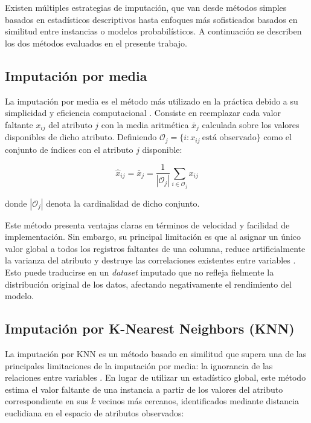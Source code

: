 Existen múltiples estrategias de imputación, que van desde métodos simples
basados en estadísticos descriptivos hasta enfoques más sofisticados basados
en similitud entre instancias o modelos probabilísticos. A continuación se
describen los dos métodos evaluados en el presente trabajo.

\subsection{Imputación por media}

La imputación por media es el método más utilizado en la práctica debido
a su simplicidad y eficiencia computacional \parencite{garcia2017}. Consiste
en reemplazar cada valor faltante $x_{ij}$ del atributo $j$ con la media
aritmética $\bar{x}_j$ calculada sobre los valores disponibles de dicho
atributo. Definiendo $\mathcal{O}_j = \{i : x_{ij}\ \text{está observado}\}$
como el conjunto de índices con el atributo $j$ disponible:

\begin{equation}
    \hat{x}_{ij} = \bar{x}_j = \frac{1}{|\mathcal{O}_j|}
    \sum_{i \in \mathcal{O}_j} x_{ij}
\end{equation}

donde $|\mathcal{O}_j|$ denota la cardinalidad de dicho conjunto.

Este método presenta ventajas claras en términos de velocidad y facilidad
de implementación. Sin embargo, su principal limitación es que al asignar
un único valor global a todos los registros faltantes de una columna, reduce
artificialmente la varianza del atributo y destruye las correlaciones
existentes entre variables \parencite{little2019}. Esto puede traducirse en
un \textit{dataset} imputado que no refleja fielmente la distribución original de los
datos, afectando negativamente el rendimiento del modelo.

\subsection{Imputación por K-Nearest Neighbors (KNN)}

La imputación por KNN es un método basado en similitud que supera una de
las principales limitaciones de la imputación por media: la ignorancia de
las relaciones entre variables \parencite{troyanskaya2001}. En lugar de
utilizar un estadístico global, este método estima el valor faltante de
una instancia a partir de los valores del atributo correspondiente en sus
$k$ vecinos más cercanos, identificados mediante distancia euclidiana en
el espacio de atributos observados:

